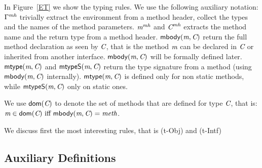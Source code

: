 In Figure~\ref{ET} we show the typing rules.
We use the following auxiliary notation:
$\Gamma^\textit{mh}$ trivially extract the environment from a method header, collect the types and the names of the method parameters.
$\textit{m}^\textit{mh}$ and $\textit{C}^\textit{mh}$ extracts the method name and the return type from a method header.
$\textsf{mbody}(\textit{m},\textit{C})$ return the full method declaration as seen by $\textit{C}$, that is the method $\textit{m}$ can be declared in $\textit{C}$ or inherited from another interface.
$\textsf{mbody}(\textit{m},\textit{C})$ will be formally defined later.
$\textsf{mtype}(\textit{m},\textit{C})$ and 
$\textsf{mtypeS}(\textit{m},\textit{C})$ return the type signature from a method (using $\textsf{mbody}(\textit{m},\textit{C})$ internally).
$\textsf{mtype}(\textit{m},\textit{C})$ is defined only for non static methods, while
$\textsf{mtypeS}(\textit{m},\textit{C})$ only on static ones.

We use $\textsf{dom}(\textit{C})$ to denote the set of methods that are defined for type $\textit{C}$, that is: $\m\in\dom(\C)\ \miff \ \mBody(\m,\C)=\method$.

We discuss first the most interesting rules, that is
(t-Obj) and  (t-Intf) 




\subsection{Auxiliary Definitions}

